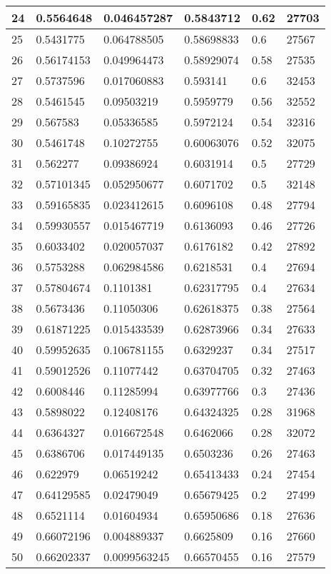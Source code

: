 \begin{longtable}{|l|l|l|l|l|l|}
24 & 0.5564648 & 0.046457287 & 0.5843712 & 0.62 & 27703 \\ \hline 
25 & 0.5431775 & 0.064788505 & 0.58698833 & 0.6 & 27567 \\ \hline 
26 & 0.56174153 & 0.049964473 & 0.58929074 & 0.58 & 27535 \\ \hline 
27 & 0.5737596 & 0.017060883 & 0.593141 & 0.6 & 32453 \\ \hline 
28 & 0.5461545 & 0.09503219 & 0.5959779 & 0.56 & 32552 \\ \hline 
29 & 0.567583 & 0.05336585 & 0.5972124 & 0.54 & 32316 \\ \hline 
30 & 0.5461748 & 0.10272755 & 0.60063076 & 0.52 & 32075 \\ \hline 
31 & 0.562277 & 0.09386924 & 0.6031914 & 0.5 & 27729 \\ \hline 
32 & 0.57101345 & 0.052950677 & 0.6071702 & 0.5 & 32148 \\ \hline 
33 & 0.59165835 & 0.023412615 & 0.6096108 & 0.48 & 27794 \\ \hline 
34 & 0.59930557 & 0.015467719 & 0.6136093 & 0.46 & 27726 \\ \hline 
35 & 0.6033402 & 0.020057037 & 0.6176182 & 0.42 & 27892 \\ \hline 
36 & 0.5753288 & 0.062984586 & 0.6218531 & 0.4 & 27694 \\ \hline 
37 & 0.57804674 & 0.1101381 & 0.62317795 & 0.4 & 27634 \\ \hline 
38 & 0.5673436 & 0.11050306 & 0.62618375 & 0.38 & 27564 \\ \hline 
39 & 0.61871225 & 0.015433539 & 0.62873966 & 0.34 & 27633 \\ \hline 
40 & 0.59952635 & 0.106781155 & 0.6329237 & 0.34 & 27517 \\ \hline 
41 & 0.59012526 & 0.11077442 & 0.63704705 & 0.32 & 27463 \\ \hline 
42 & 0.6008446 & 0.11285994 & 0.63977766 & 0.3 & 27436 \\ \hline 
43 & 0.5898022 & 0.12408176 & 0.64324325 & 0.28 & 31968 \\ \hline 
44 & 0.6364327 & 0.016672548 & 0.6462066 & 0.28 & 32072 \\ \hline 
45 & 0.6386706 & 0.017449135 & 0.6503236 & 0.26 & 27463 \\ \hline 
46 & 0.622979 & 0.06519242 & 0.65413433 & 0.24 & 27454 \\ \hline 
47 & 0.64129585 & 0.02479049 & 0.65679425 & 0.2 & 27499 \\ \hline 
48 & 0.6521114 & 0.01604934 & 0.65950686 & 0.18 & 27636 \\ \hline 
49 & 0.66072196 & 0.004889337 & 0.6625809 & 0.16 & 27660 \\ \hline 
50 & 0.66202337 & 0.0099563245 & 0.66570455 & 0.16 & 27579 \\ \hline 
\end{longtable}